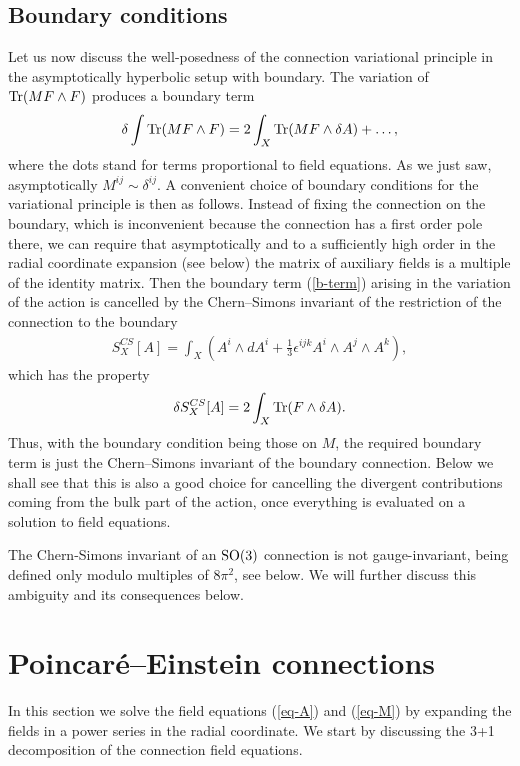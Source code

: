 \documentclass[a4paper,12pt]{article}
\newcommand{\be}{\begin{eqnarray}}
\newcommand{\ee}{\end{eqnarray}}
\begin{document}
\subsection{Boundary conditions}

Let us now discuss the well-posedness of the connection variational principle in the asymptotically hyperbolic setup with boundary. The variation of ${\rm Tr}(M F\wedge F)$ produces a boundary term 
\be\label{b-term}
\delta \int {\rm Tr}(M F\wedge F) = 2 \int_X {\rm Tr}( M F \wedge \delta A) + \ldots,
\ee
where the dots stand for terms proportional to field equations. As we just saw, asymptotically $M^{ij}\sim \delta^{ij}$. A convenient choice of boundary conditions for the variational principle is then as follows. Instead of fixing the connection on the boundary, which is inconvenient because the connection has a first order pole there, we can require that asymptotically and to a sufficiently high order in the radial coordinate expansion (see below) the matrix of auxiliary fields is a multiple of the identity matrix. Then the boundary term (\ref{b-term}) arising in the variation of the action is cancelled by the Chern--Simons invariant of the restriction of the connection to the boundary
\be\label{CS}
S^{CS}_X[A] = \int_X \left( A^i \wedge dA^i + \frac{1}{3} \epsilon^{ijk} A^i\wedge A^j\wedge A^k\right),
\ee
which has the property
\be
\delta S^{CS}_X[A] = 2 \int_X {\rm Tr}(F \wedge \delta A).
\ee
Thus, with the boundary condition being those on $M$, the required boundary term is just the Chern--Simons invariant of the boundary connection. Below we shall see that this is also a good choice for cancelling the divergent contributions coming from the bulk part of the action, once everything is evaluated on a solution to field equations. 

The Chern-Simons invariant of an ${\rm SO}(3)$ connection is not gauge-invariant, being defined only modulo multiples of $8\pi^2$, see below. We will further discuss this ambiguity and its consequences below.

\section{Poincar\'e--Einstein connections}
\label{sec:PE-conn}

In this section we solve the field equations (\ref{eq-A}) and (\ref{eq-M}) by expanding the fields in a power series in the radial coordinate. We start by discussing the 3+1 decomposition of the connection field equations. 
\end{document}
